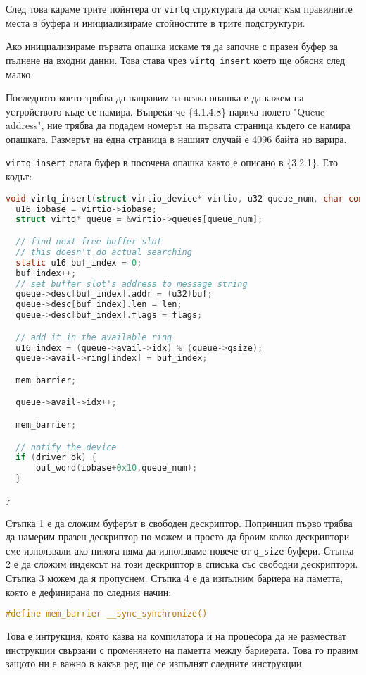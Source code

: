 След това караме трите пойнтера от {\tt virtq} структурата да сочат към правилните места в буфера и инициализираме стойностите в трите подструктури.

Ако инициализираме първата опашка искаме тя да започне с празен буфер за пълнене на входни данни. Това става чрез {\tt virtq\_insert} което ще обясня след малко.

Последното което трябва да направим за всяка опашка е да кажем на устройството къде се намира. Въпреки че \{4.1.4.8\} нарича полето "Queue address", ние трябва да подадем номерът на първата страница където се намира опашката. Размерът на една страница в нашият случай е 4096 байта но варира.

{\tt virtq\_insert} слага буфер в посочена опашка както е описано в \{3.2.1\}. Ето кодът:
\begin{lstlisting}[language=C]
void virtq_insert(struct virtio_device* virtio, u32 queue_num, char const* buf, u32 len, u8 flags) {
  u16 iobase = virtio->iobase;
  struct virtq* queue = &virtio->queues[queue_num];

  // find next free buffer slot
  // this doesn't do actual searching
  static u16 buf_index = 0;
  buf_index++;
  // set buffer slot's address to message string
  queue->desc[buf_index].addr = (u32)buf;
  queue->desc[buf_index].len = len;
  queue->desc[buf_index].flags = flags;

  // add it in the available ring
  u16 index = (queue->avail->idx) % (queue->qsize);
  queue->avail->ring[index] = buf_index;

  mem_barrier;

  queue->avail->idx++;

  mem_barrier;

  // notify the device
  if (driver_ok) {
      out_word(iobase+0x10,queue_num);
  }

}
\end{lstlisting}
Стъпка 1 е да сложим буферът в свободен дескриптор. Попринцип първо трябва да намерим празен дескриптор но можем и просто да броим колко дескриптори сме използвали ако никога няма да използваме повече от {\tt q\_size} буфери. Стъпка 2 е да сложим индексът на този дескриптор в списъка със свободни дескриптори. Стъпка 3 можем да я пропуснем. Стъпка 4 е да изпълним бариера на паметта, която е дефинирана по следния начин:
\begin{lstlisting}[language=C]
#define mem_barrier __sync_synchronize()
\end{lstlisting}
Това е интрукция, която казва на компилатора и на процесора да не разместват инструкции свързани с променянето на паметта между бариерата. Това го правим защото ни е важно в какъв ред ще се изпълнят следните инструкции.

